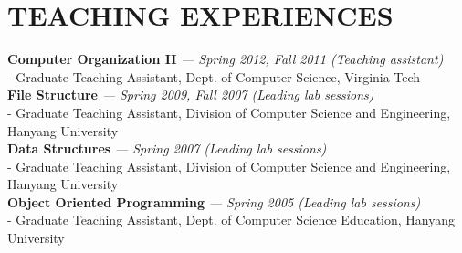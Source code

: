 \section{TEACHING EXPERIENCES} 
\vspace{0.07in} 
   {\bf Computer Organization II}
   {\it \footnotesize --- Spring 2012, Fall 2011 (Teaching assistant)}\\
      - {\small Graduate Teaching Assistant, Dept. of Computer Science, Virginia
      Tech}
\vspace{0.03in}\\
   {\bf File Structure}
   {\it \footnotesize --- Spring 2009, Fall 2007 (Leading lab sessions)}\\
      - {\small Graduate Teaching Assistant, Division of Computer Science and
      Engineering, Hanyang University}
\vspace{0.03in}\\
   {\bf Data Structures}
   {\it \footnotesize --- Spring 2007 (Leading lab sessions)}\\
      - {\small Graduate Teaching Assistant, Division of Computer Science and
      Engineering, Hanyang University}
\vspace{0.03in}\\
   {\bf Object Oriented Programming}
   {\it \footnotesize --- Spring 2005 (Leading lab sessions)}\\
      - {\small Graduate Teaching Assistant, Dept. of Computer Science
      Education, Hanyang University}

